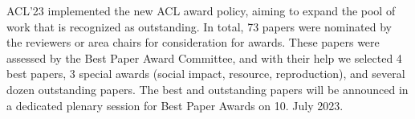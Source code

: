 
ACL'23 implemented the new ACL award policy, aiming to expand the pool of work that is recognized as outstanding. In total, 73 papers were nominated by the reviewers or area chairs for consideration for awards. These papers were assessed by the Best Paper Award Committee, and with their help we selected 4 best papers, 3 special awards (social impact, resource, reproduction), and several dozen outstanding papers. The best and outstanding papers will be announced in a dedicated plenary session for Best Paper Awards on 10. July 2023.






